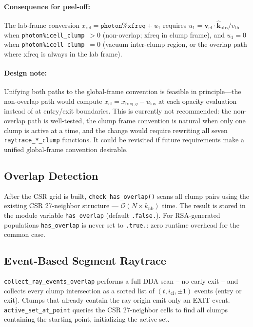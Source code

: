 \documentclass[english,a4paper]{my_memo}
\begin{document}
\paragraph{Consequence for peel-off:}
The lab-frame conversion
$x_\mathrm{ref} = \texttt{photon\%xfreq} + u_1$
requires $u_1 = \boldsymbol{v}_\mathrm{cl}\cdot\hat{\mathbf{k}}_\mathrm{obs}/v_\mathrm{th}$
when \texttt{photon\%icell\_clump}~$> 0$ (non-overlap; xfreq in clump frame),
and $u_1 = 0$ when \texttt{photon\%icell\_clump}~$= 0$
(vacuum inter-clump region, or the overlap path where xfreq is always in
the lab frame).

\paragraph{Design note:}
Unifying both paths to the global-frame convention is feasible in
principle---the non-overlap path would compute
$x_\mathrm{cl} = x_{\mathrm{freq},g} - u_\mathrm{los}$ at each opacity
evaluation instead of at entry/exit boundaries.  This is currently not
recommended: the non-overlap path is well-tested, the clump frame
convention is natural when only one clump is active at a time, and the
change would require rewriting all seven \texttt{raytrace\_*\_clump}
functions.  It could be revisited if future requirements make a unified
global-frame convention desirable.

\subsection{Overlap Detection}

After the CSR grid is built, \texttt{check\_has\_overlap()} scans all
clump pairs using the existing CSR 27-neighbor structure ---
$\mathcal{O}(N \times k_\mathrm{nb})$ time.  The result is stored in the
module variable \texttt{has\_overlap} (default \texttt{.false.}).  For
RSA-generated populations \texttt{has\_overlap} is never set to
\texttt{.true.}: zero runtime overhead for the common case.

\subsection{Event-Based Segment Raytrace}

\texttt{collect\_ray\_events\_overlap} performs a full DDA scan -- no
early exit -- and collects every clump intersection as a sorted list of
$(t, i_\mathrm{cl}, \pm 1)$ events (entry or exit).  Clumps that already
contain the ray origin emit only an EXIT event.
\texttt{active\_set\_at\_point} queries the CSR 27-neighbor cells to find
all clumps containing the starting point, initializing the active set.
\end{document}
